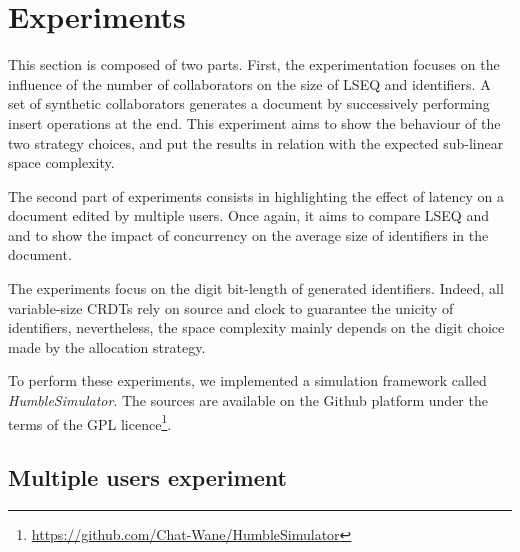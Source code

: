 
\section{Experiments}
\label{sec:experiments}

This section is composed of two parts. First, the experimentation focuses on
the influence of the number of collaborators on the size of LSEQ and \NAME{}
identifiers.  A set of synthetic collaborators generates a document by
successively performing insert operations at the end. This experiment aims to
show the behaviour of the two strategy choices, and put the results in relation
with the expected sub-linear space complexity.

The second part of experiments consists in highlighting the effect of latency
on a document edited by multiple users. Once again, it aims to compare LSEQ and
\NAME{} and to show the impact of concurrency on the average size of
identifiers in the document.

The experiments focus on the digit bit-length of generated identifiers.
Indeed, all variable-size CRDTs rely on source and clock to guarantee the
unicity of identifiers, nevertheless, the space complexity mainly depends on
the digit choice made by the allocation strategy.

To perform these experiments, we implemented a simulation framework called
\emph{HumbleSimulator}. The sources are available on the Github platform under
the terms of the GPL
licence\footnote{\url{https://github.com/Chat-Wane/HumbleSimulator}}.

\subsection{Multiple users experiment}


